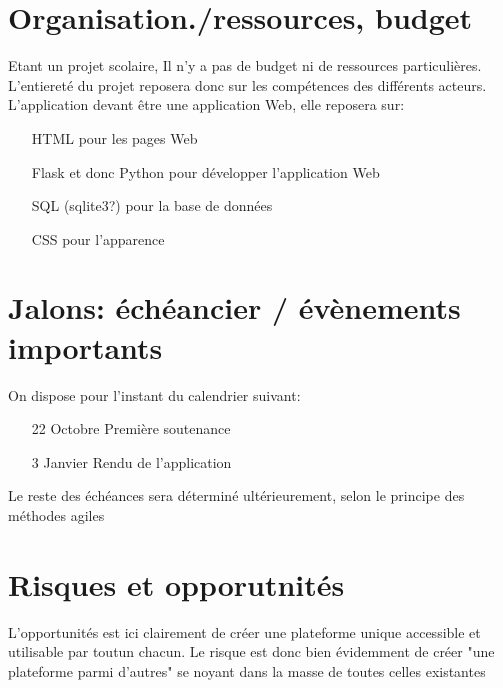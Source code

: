 \newpage

\section{Organisation./ressources, budget}
Etant un projet scolaire, Il n'y a pas de budget ni de ressources particulières. L'entiereté du projet reposera donc sur les compétences des différents acteurs.\\
L'application devant être une application Web, elle reposera sur:
\begin{itemize}
	\item[HTML] pour les pages Web
	\item[Flask] et donc Python pour développer l'application Web
	\item[SQL] (sqlite3?) pour la base de données
	\item[CSS] pour l'apparence
\end{itemize}

\section{Jalons: échéancier / évènements importants}
On dispose pour l'instant du calendrier suivant:
\begin{itemize}
	\item[22 Octobre] Première soutenance
	\item[3 Janvier] Rendu de l'application
\end{itemize}

Le reste des échéances sera déterminé ultérieurement, selon le principe des méthodes agiles

\section{Risques et opporutnités}
L'opportunités est ici clairement de créer une plateforme unique accessible et utilisable par toutun chacun. Le risque est donc bien évidemment de créer "une plateforme parmi d'autres" se noyant dans la masse de toutes celles existantes

